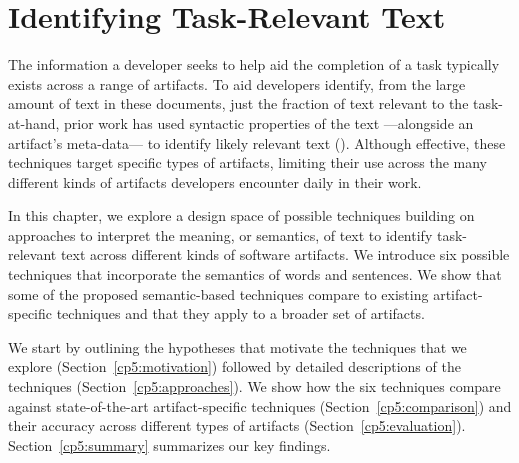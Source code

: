 \setcounter{chapter}{4}
\setcounter{rq}{1}


\chapter{Identifying Task-Relevant Text}
\label{ch:identifying}

The information a developer seeks to help aid the completion of a task typically exists
across a range of artifacts. 
To aid developers identify, from the large amount of text
in these documents, just the fraction of text relevant
to the task-at-hand, prior work has used syntactic properties of the text
---alongside an artifact's meta-data---
 to identify likely relevant text ().
Although effective, these techniques target specific
types of artifacts, limiting their use across the 
many different kinds of artifacts developers encounter
daily in their work.



In this chapter, we explore a design space of possible techniques building on approaches to interpret the meaning, or semantics, of text
to identify task-relevant text across different kinds of software artifacts.
We introduce six possible techniques that incorporate the  
semantics of words and sentences. 
We show that some of the proposed semantic-based techniques 
compare to existing artifact-specific techniques 
and that they apply to a broader set of artifacts.






We start by outlining the hypotheses that motivate the techniques that we explore (Section~\ref{cp5:motivation}) followed by detailed descriptions of the
techniques (Section~\ref{cp5:approaches}).
We show how the six techniques 
compare against state-of-the-art artifact-specific techniques 
(Section~\ref{cp5:comparison}) and 
their accuracy across different types of artifacts (Section~\ref{cp5:evaluation}). 
Section~\ref{cp5:summary} summarizes our key findings.

\clearpage




